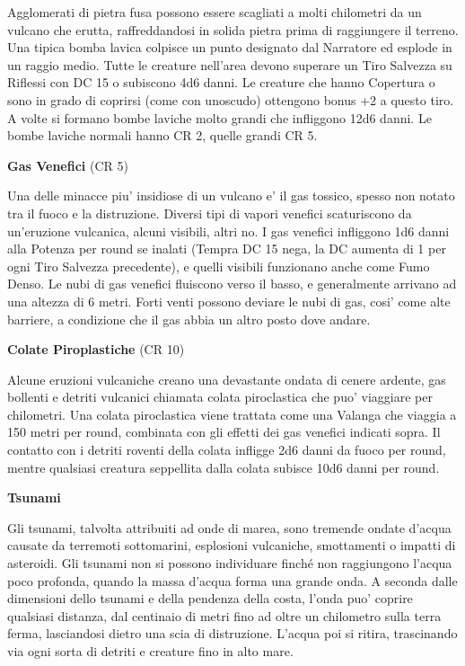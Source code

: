 \documentclass[a4paper,11pt,twoside,openany]{dndbook}
\begin{document}
Agglomerati di pietra fusa possono essere scagliati a molti chilometri da un vulcano che erutta, raffreddandosi in solida pietra prima di raggiungere il terreno. Una tipica bomba lavica colpisce un punto designato dal Narratore ed esplode in un raggio medio. Tutte le creature nell'area devono superare un Tiro Salvezza su Riflessi con DC 15 o subiscono 4d6 danni. Le creature che hanno Copertura o sono in grado di coprirsi (come con uno­scudo) ottengono bonus +2 a questo tiro. A volte si formano bombe laviche molto grandi che infliggono 12d6 danni. Le bombe laviche normali hanno CR 2, quelle grandi CR 5.

\textbf{Gas Venefici} (CR 5)

Una delle minacce piu' insidiose di un vulcano e' il gas tossico, spesso non notato tra il fuoco e la distruzione. Diversi tipi di vapori venefici scaturiscono da un'eruzione vulcanica, alcuni visibili, altri no. I gas venefici infliggono 1d6 danni alla Potenza per round se inalati (Tempra DC 15 nega, la DC aumenta di 1 per ogni Tiro Salvezza precedente), e quelli visibili funzionano anche come Fumo Denso. Le nubi di gas venefici fluiscono verso il basso, e generalmente arrivano ad una altezza di 6 metri. Forti venti possono deviare le nubi di gas, cosi' come alte barriere, a condizione che il gas abbia un altro posto dove andare.

\textbf{Colate Piroplastiche} (CR 10)

Alcune eruzioni vulcaniche creano una devastante ondata di cenere ardente, gas bollenti e detriti vulcanici chiamata colata piroclastica che puo' viaggiare per chilometri. Una colata piroclastica viene trattata come una Valanga che viaggia a 150 metri per round, combinata con gli effetti dei gas venefici indicati sopra. Il contatto con i detriti roventi della colata infligge 2d6 danni da fuoco per round, mentre qualsiasi creatura seppellita dalla colata subisce 10d6 danni per round.

\textbf{Tsunami}

Gli tsunami, talvolta attribuiti ad onde di marea, sono tremende ondate d'acqua causate da terremoti sottomarini, esplosioni vulcaniche, smottamenti o impatti di asteroidi. Gli tsunami non si possono individuare finché non raggiungono l'acqua poco profonda, quando la massa d'acqua forma una grande onda. A seconda dalle dimensioni dello tsunami e del­la pendenza della costa, l'onda puo' coprire qualsiasi distanza, dal centinaio di metri fino ad oltre un chilometro sulla terra ferma, lasciandosi dietro una scia di distruzione. L'acqua poi si ritira, trascinando via ogni sorta di detriti e creature fino in alto mare.
\end{document}
